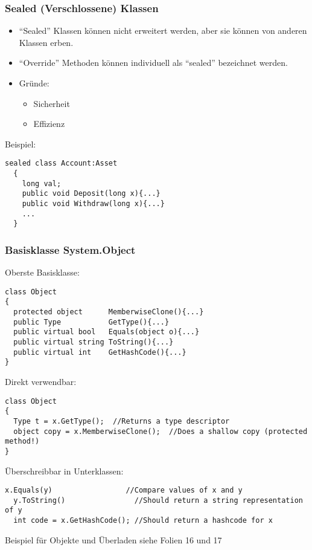 \subsubsection{Sealed (Verschlossene) Klassen}
\begin{itemize}
  \item "`Sealed"' Klassen können nicht erweitert werden, aber sie können von
  anderen Klassen erben. 
  \item "`Override"' Methoden können individuell als "`sealed"' bezeichnet
  werden.
  \item Gründe:
  \begin{itemize}
    \item Sicherheit
    \item Effizienz
  \end{itemize}
\end{itemize}
Beispiel: 
\begin{lstlisting}[style=Csharp]
  sealed class Account:Asset
  {
    long val; 
    public void Deposit(long x){...}
    public void Withdraw(long x){...}
    ...
  }
\end{lstlisting}

\subsubsection{Basisklasse System.Object}
Oberste Basisklasse:
\begin{lstlisting}[style=Csharp]
class Object
{
  protected object      MemberwiseClone(){...}
  public Type           GetType(){...}
  public virtual bool   Equals(object o){...}
  public virtual string ToString(){...}
  public virtual int    GetHashCode(){...}
}
\end{lstlisting}
Direkt verwendbar: 
\begin{lstlisting}[style=Csharp]
class Object
{
  Type t = x.GetType();  //Returns a type descriptor
  object copy = x.MemberwiseClone();  //Does a shallow copy (protected method!)
}
\end{lstlisting}
Überschreibbar in Unterklassen: 
\begin{lstlisting}[style=Csharp]
  x.Equals(y)                 //Compare values of x and y
  y.ToString()                //Should return a string representation of y
  int code = x.GetHashCode(); //Should return a hashcode for x
\end{lstlisting}

Beispiel für Objekte und Überladen siehe Folien 16 und 17
